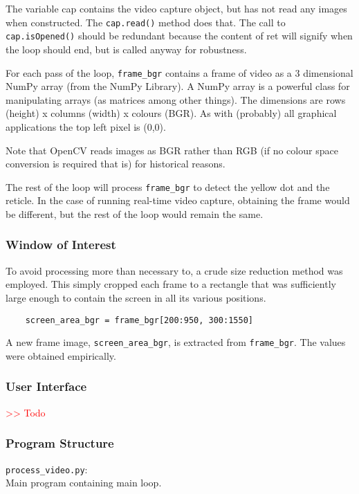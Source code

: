 \documentclass[final]{cmpreport_02}
\begin{document}
The variable cap contains the video capture object, but has not read any images when constructed. The \verb|cap.read()| method does that. The call to \verb|cap.isOpened()| should be redundant because the content of ret will signify when the loop should end, but is called anyway for robustness.

For each pass of the loop, \verb|frame_bgr| contains a frame of video as a 3 dimensional NumPy array (from the NumPy Library). A NumPy array is a powerful class for manipulating arrays (as matrices among other things). The dimensions are rows (height) x columns (width) x colours (BGR). As with (probably) all graphical applications the top left pixel is (0,0).

Note that OpenCV reads images as BGR rather than RGB (if no colour space conversion is required that is) for historical reasons.

The rest of the loop will process \verb|frame_bgr| to detect the yellow dot and the reticle. In the case of running real-time video capture, obtaining the frame would be different, but the rest of the loop would remain the same.

\subsubsection{Window of Interest}

To avoid processing more than necessary to, a crude size reduction method was employed. This simply cropped each frame to a rectangle that was sufficiently large enough to contain the screen in all its various positions.

\begin{verbatim}
	screen_area_bgr = frame_bgr[200:950, 300:1550]
\end{verbatim}
\noindent
A new frame image, \verb|screen_area_bgr|, is extracted from \verb|frame_bgr|. The values were obtained empirically.

\subsubsection{User Interface}

\textcolor{red}{>> Todo}

\subsubsection{Program Structure}

\verb|process_video.py|:\\
Main program containing main loop.\\
\end{document}
